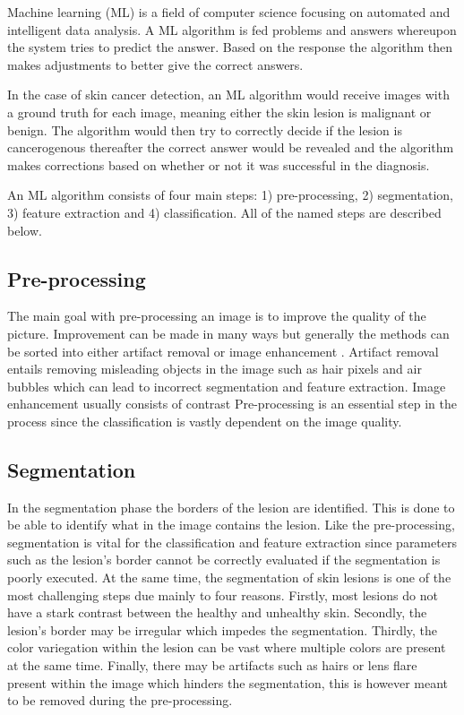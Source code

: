 \documentclass{kththesis}
\begin{document}
Machine learning (ML) is a field of computer science focusing on automated and intelligent data analysis. A ML algorithm is fed problems and answers whereupon the system tries to predict the answer. Based on the response the algorithm then makes adjustments to better give the correct answers. \parencite{das2021machine}

In the case of skin cancer detection, an ML algorithm would receive images with a ground truth for each image, meaning either the skin lesion is malignant or benign. The algorithm would then try to correctly decide if the lesion is cancerogenous thereafter the correct answer would be revealed and the algorithm makes corrections based on whether or not it was successful in the diagnosis.

An ML algorithm consists of four main steps: 1) pre-processing, 2) segmentation, 3) feature extraction and 4) classification. All of the named steps are described below.

\subsection{Pre-processing}

The main goal with pre-processing an image is to improve the quality of the picture. Improvement can be made in many ways but generally the methods can be sorted into either artifact removal or image enhancement \parencite{8377976}.
Artifact removal entails removing misleading objects in the image such as hair pixels and air bubbles which can lead to incorrect segmentation and feature extraction. Image enhancement usually consists of contrast Pre-processing is an essential step in the process since the classification is vastly dependent on the image quality. \parencite{jaworek2016automatic}

\subsection{Segmentation}

In the segmentation phase the borders of the lesion are identified. This is done to be able to identify what in the image contains the lesion. Like the pre-processing, segmentation is vital for the classification and feature extraction since parameters such as the lesion’s border cannot be correctly evaluated if the segmentation is poorly executed. At the same time, the segmentation of skin lesions is one of the most challenging steps due mainly to four reasons. Firstly, most lesions do not have a stark contrast between the healthy and unhealthy skin. Secondly, the lesion’s border may be irregular which impedes the segmentation. Thirdly, the color variegation %
within the lesion can be vast where multiple colors are present at the same time. Finally, there may be artifacts such as hairs or lens flare present within the image which hinders the segmentation, this is however meant to be removed during the pre-processing. \parencite{jaworek2016automatic}
\end{document}
